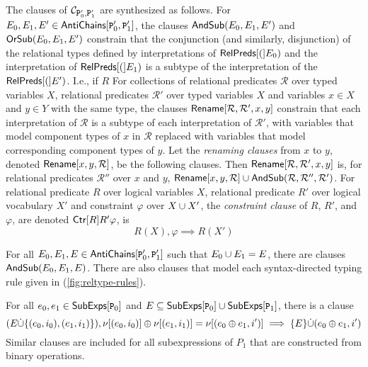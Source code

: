 The clauses of $\mathcal{C}_{ \cc{P}_0', \cc{P}_1' }$ are synthesized
as follows.
For $E_0, E_1, E' \in \antichains{ \cc{P}_0' }{ \cc{P}_1' }$, the
clauses $\mathsf{AndSub}(E_0, E_1, E')$ and $\mathsf{OrSub}(E_0, E_1, E')$ constrain
that the conjunction (and similarly, disjunction) of the relational
types defined by interpretations of $\mathsf{RelPreds}[ ( ]E_0)$ and the
interpretation of $\mathsf{RelPreds}[ ( ]E_1)$ is a subtype of the
interpretation of the $\mathsf{RelPreds}[ ( ]E')$.
%
I.e., if $R$
%
%
For collections 
%
%
of relational predicates $\mathcal{R}$ over typed variables $X$,
relational predicates $\mathcal{R}'$ over typed variables $X$ and
variables $x \in X$ and $y \in Y$ with the same type, the clauses
$\mathsf{Rename}[  \mathcal{R} ,  \mathcal{R'} ,  x ,  y  ]$ constrain that
each interpretation of $\mathcal{R}$ is a subtype of each
interpretation of $\mathcal{R}'$, with variables that model component
types of $x$ in $\mathcal{R}$ replaced with variables that model
corresponding component types of $y$.
%
Let the \emph{renaming clauses} from $x$ to $y$, denoted
$\mathsf{Rename}[  x ,  y ,  \mathcal{R}  ]$, be the following clauses.
%
%
Then $\mathsf{Rename}[  \mathcal{R} ,  \mathcal{R}' ,  x ,  y  ]$ is, for
relational predicates $\mathcal{R}''$ over $x$ and $y$,
$\mathsf{Rename}[  x ,  y ,  \mathcal{R}  ] \cup \mathsf{AndSub}( \mathcal{R},
\mathcal{R}'', \mathcal{R}')$.
For relational predicate $R$ over logical variables $X$, %
relational predicate $R'$ over logical vocabulary $X'$ and constraint
$\varphi$ over $X \cup X'$, the \emph{constraint clause} of $R$,
$R'$, and $\varphi$, are denoted $\mathsf{Ctr}[  R  ]{ R' }{\varphi}$, is
\[ R(X), \varphi \implies R(X')
\]

%
For all $E_0, E_1, E \in \antichains{ \cc{P}_0' }{ \cc{P}_1' }$ such
that $E_0 \cup E_1 = E$, there are clauses $\mathsf{AndSub}(E_0, E_1, E)$.
%
There are also clauses that model each syntax-directed typing rule
given in (\autoref{fig:reltype-rules}).
%

For all $e_0, e_1 \in \subexps{ \cc{P}_0 }$ and $E \subseteq \subexps{
  \cc{P}_0 } \union \subexps{ \cc{P}_1 }$, there is a clause
\[ (E \disjunion \elts{ (e_0, i_0), (e_1, i_1) } ), %
\resvar{ (e_0, i_0) } \oplus \resvar{ (e_1, i_1) } = %
\resvar{ (e_0 \oplus e_1, i') } \implies %
\disjadd{ E }{ (e_0 \oplus e_1, i') }
\]
%
%
Similar clauses are included for all subexpressions of $P_1$ that are
constructed from binary operations.

